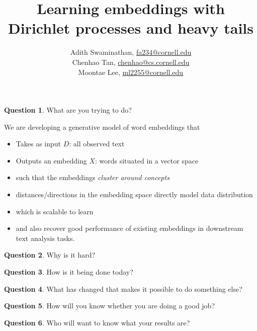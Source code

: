 \documentclass[12pt]{article}
\title{Learning embeddings with Dirichlet processes and heavy tails}
\author{Adith Swaminathan, \href{fa234@cornell.edu}{fa234@cornell.edu} \\
Chenhao Tan, \href{chenhao@cs.cornell.edu}{chenhao@cs.cornell.edu} \\
Moontae Lee, \href{ml2255@cornell.edu}{ml2255@cornell.edu}}
\theoremstyle{plain} \numberwithin{equation}{section}
\theoremstyle{definition}
\newtheorem{question}{Question}
\begin{document}
\maketitle

\begin{question}{What are you trying to do?}
\end{question}
We are developing a generative model of word embeddings that
\begin{itemize}
\item Takes as input $D$: all observed text
\item Outputs an embedding $X$: words situated in a vector space
\item such that the embeddings \emph{cluster around concepts}
\item distances/directions in the embedding space directly model data distribution
\item which is scalable to learn
\item and also recover good performance of existing embeddings in downstream text analysis tasks.
\end{itemize}

\begin{question}{Why is it hard?}
\end{question}


\begin{question}{How is it being done today?}
\end{question}

\begin{question}{What has changed that makes it possible to do something else?}
\end{question}

\begin{question}{How will you know whether you are doing a good job?}
\end{question}

\begin{question}{Who will want to know what your results are?}
\end{question}



\end{document}
